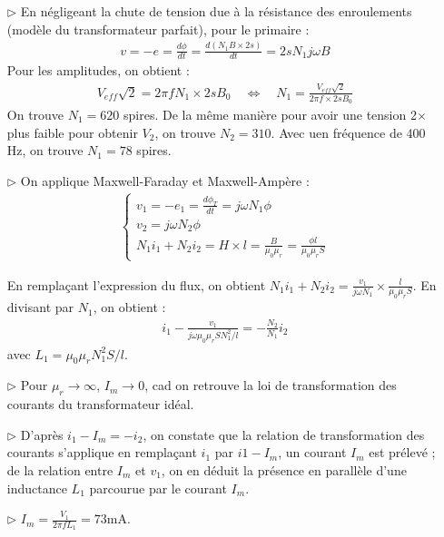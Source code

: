 \documentclass{report}
\begin{document}
\begin{itemize}

	\item[$\triangleright$] En négligeant la chute de tension due à la résistance des enroulements (modèle du transformateur parfait), pour le primaire :
	\begin{align*}
		v=-e=\frac{d\phi}{dt}=\frac{d(N_1B\times 2s)}{dt}=2sN_1j\omega B
	\end{align*}
	Pour les amplitudes, on obtient : 
	\begin{align*}
		V_{eff}\sqrt{2}=2\pi fN_1\times2sB_0 \quad \Leftrightarrow \quad N_1=\frac{V_{eff}\sqrt{2}}{2\pi f\times2sB_0}
	\end{align*}
On trouve $N_1=620$ spires. De la même manière pour avoir une tension 2$\times$ plus faible pour obtenir $V_2$, on trouve $N_2=310$.
Avec uen fréquence de 400 Hz, on trouve $N_1=78$ spires.

	\item[$\triangleright$] On applique Maxwell-Faraday et Maxwell-Ampère :
	\begin{align*}
		\begin{cases}
        	v_1=-e_1=\frac{d\phi_T}{dt}=j\omega N_1\phi \\ 
			v_2 = j\omega N_2\phi \\
			 N_1i_1+N_2i_2=H\times l=\frac{B}{\mu_0\mu_r}=\frac{\phi l}{\mu_0\mu_r S}
		\end{cases}  
	\end{align*}
	
	En remplaçant l'expression du flux, on obtient $N_1i_1+N_2i_2=\frac{v_1}{j\omega N_1}\times\frac{l}{\mu_0\mu_r S}$. En divisant par $N_1$, on obtient :
	\begin{align*}
		i_1-\frac{v_1}{j\omega \mu_0\mu_r SN_1^2/l}=-\frac{N_2}{N_1}i_2
	\end{align*}
	avec $L_1=\mu_0\mu_rN_1^2S/l$.
	
	\item[$\triangleright$] Pour $\mu_r\longrightarrow\infty$, $I_m\longrightarrow0$, cad on retrouve la loi de transformation des courants du transformateur idéal.

	\item[$\triangleright$] D'après $i_1 - I_m = - i_2$, on constate que la relation de transformation des courants s'applique en remplaçant $i_1$ par $i1 - I_m$, un courant $I_m$ est prélevé ; de la relation entre $I_m$ et $v_1$, on en déduit la présence en parallèle d'une inductance $L_1$ parcourue par le courant $I_m$.
	
	\item[$\triangleright$] $I_m=\frac{V_1}{2\pi fL_1}=73$mA.

\end{itemize}
\end{document}

